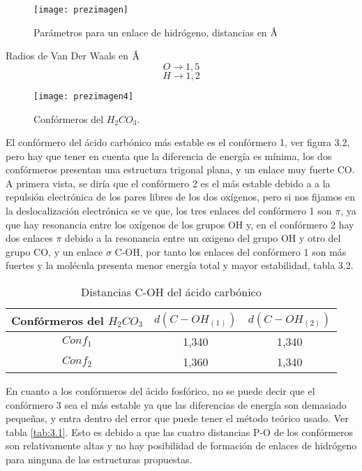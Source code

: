 \begin{figure}[H]
	\centering
	\texttt{[image: prezimagen]}
	\caption{Parámetros para un enlace de hidrógeno, distancias en $\mbox{\normalfont\AA}$}
\end{figure}

\begin{center} Radios de Van Der Waals en $\mbox{\normalfont\AA} $
	$$O\longrightarrow1,5$$
	$$H\longrightarrow1,2
	$$
\end{center}

\begin{figure}[H]
	\centering
	\texttt{[image: prezimagen4]}
	\caption{Confórmeros del $H_2CO_3$.}
\end{figure}
El confórmero del ácido carbónico más estable es el confórmero 1, ver figura 3.2, pero hay que tener en cuenta que la diferencia de energía es mínima, los dos confórmeros presentan una estructura trigonal plana, y un enlace muy fuerte CO. A primera vista, se diría que el confórmero 2 es el más estable debido a a la repulsión electrónica de los pares libres de los dos oxígenos, pero si nos fijamos en la deslocalización electrónica se ve que, los tres enlaces del confórmero 1 son $\pi$, ya que hay resonancia entre los oxígenos de los grupos OH y, en el confórmero 2 hay dos enlaces $\pi$ debido a la resonancia entre un oxigeno del grupo OH y otro del grupo CO, y un enlace $\sigma$ C-OH, por tanto los enlaces del confórmero 1 son más fuertes y la molécula presenta menor energía total y mayor estabilidad, tabla 3.2. 
\begin{table}[H]
    \centering
    \begin{tabular}{|c|c|c|}
    \hline
    Confórmeros del $H_2CO_3$ & $d(C-OH_{(1)})$ & $d(C-OH_{(2)})$ \\ \hline
    $Conf_1$ & 1,340 & 1,340  \\ \hline
    $Conf_2$ & 1,360 & 1,340 \\ \hline 
    \end{tabular}
    \caption{Distancias C-OH del ácido carbónico}
\end{table}

En cuanto a los confórmeros del ácido fosfórico, no se puede decir que el confórmero 3 sea el más estable ya que las diferencias de energía son demasiado pequeñas, y entra dentro del error que puede tener el método teórico usado. Ver tabla \ref{tab:3.1}. Esto es debido a que las cuatro distancias P-O de los confórmeros son relativamente altas y no hay posibilidad de formación de enlaces de hidrógeno para ninguna de las estructuras propuestas.


